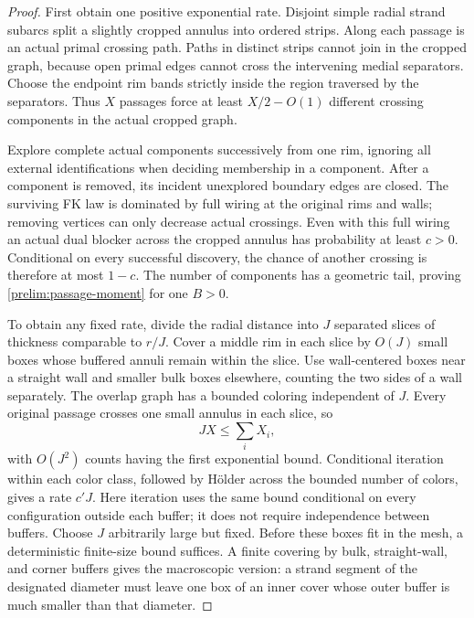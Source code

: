 \begin{proof}
First obtain one positive exponential rate. Disjoint simple radial
strand subarcs split a slightly cropped annulus into ordered strips.
Along each passage is an actual primal crossing path. Paths in distinct
strips cannot join in the cropped graph, because open primal edges cannot
cross the intervening medial separators. Choose the endpoint rim bands
strictly inside the region traversed by the separators. Thus $X$ passages
force at least $X/2-O(1)$ different crossing components in the actual
cropped graph.

Explore complete actual components successively from one rim, ignoring
all external identifications when deciding membership in a component.
After a component is removed, its incident unexplored boundary edges
are closed. The surviving FK law is dominated by full wiring at the
original rims and walls; removing vertices can only decrease actual
crossings. Even with this full wiring an actual dual blocker across the
cropped annulus has probability at least $c>0$. Conditional on every
successful discovery, the chance of another crossing is therefore at
most $1-c$. The number of components has a geometric tail, proving
\eqref{prelim:passage-moment} for one $B>0$.

To obtain any fixed rate, divide the radial distance into $J$ separated
slices of thickness comparable to $r/J$. Cover a middle rim in each slice
by $O(J)$ small boxes whose buffered annuli remain within the slice.
Use wall-centered boxes near a straight wall and smaller bulk boxes
elsewhere, counting the two sides of a wall separately. The overlap graph
has a bounded coloring independent of $J$. Every original passage crosses
one small annulus in each slice, so
\[
 JX\le\sum_i X_i,
\]
with $O(J^2)$ counts having the first exponential bound. Conditional
iteration within each color class, followed by H\"older across the
bounded number of colors, gives a rate $c'J$. Here iteration uses the
same bound conditional on every configuration outside each buffer;
it does not require independence between buffers. Choose $J$ arbitrarily
large but fixed. Before these boxes fit in the mesh, a deterministic
finite-size bound suffices. A finite covering by bulk, straight-wall,
and corner buffers gives the macroscopic version: a strand segment of
the designated diameter must leave one box of an inner cover whose
outer buffer is much smaller than that diameter.
\end{proof}

